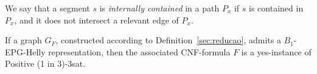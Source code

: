 \documentclass[runningheads]{llncs}
\newtheorem{fac}{Fact}[section]
\begin{document}
% 




\begin{definition}
We say that a segment $s$ is \emph{internally contained} in a path $P_{x}$ if $s$ is contained in $P_{x}$, and it does not intersect a relevant edge of $P_{x}$. 
\end{definition}



\begin{lemma}\label{lem:volta}
If a graph $G_F$, constructed according to Definition~\ref{sec:reducao}, admits a $B_1$-EPG-Helly representation, then the associated CNF-formula $F$ is a yes-instance of {\sc Positive (1 in 3)-3sat}.
\end{lemma}
\end{document}
